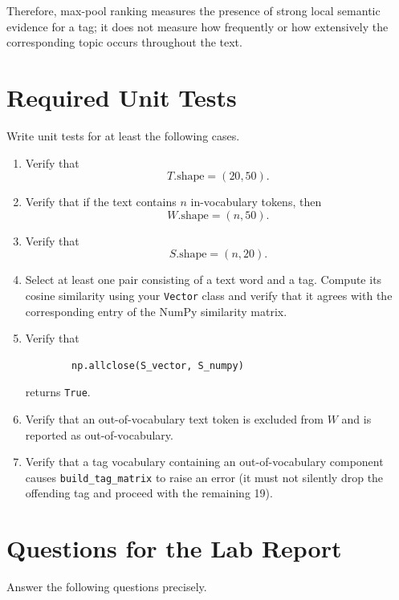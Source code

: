 \documentclass[12pt]{article}
\begin{document}
Therefore, max-pool ranking measures the presence of strong local
semantic evidence for a tag; it does not measure how frequently or
how extensively the corresponding topic occurs throughout the text.

\section*{Required Unit Tests}

Write unit tests for at least the following cases.

\begin{enumerate}
    \item Verify that
    \[
    T.\mathrm{shape}=(20,50).
    \]

    \item Verify that if the text contains \(n\) in-vocabulary tokens,
    then
    \[
    W.\mathrm{shape}=(n,50).
    \]

    \item Verify that
    \[
    S.\mathrm{shape}=(n,20).
    \]

    \item Select at least one pair consisting of a text word and a tag.
    Compute its cosine similarity using your \texttt{Vector} class and
    verify that it agrees with the corresponding entry of the NumPy
    similarity matrix.

    \item Verify that
    \begin{lstlisting}
        np.allclose(S_vector, S_numpy)
    \end{lstlisting}
    returns \texttt{True}.

    \item Verify that an out-of-vocabulary text token is excluded from
    \(W\) and is reported as out-of-vocabulary.

    \item Verify that a tag vocabulary containing an out-of-vocabulary
    component causes \texttt{build\_tag\_matrix} to raise an error
    (it must not silently drop the offending tag and proceed with the
    remaining 19).

\end{enumerate}

\section*{Questions for the Lab Report}

Answer the following questions precisely.
\end{document}
